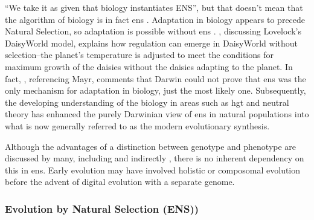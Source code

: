 ``We take it as given that biology instantiates ENS'', but that doesn't mean that the algorithm of biology is in fact \gls{ens} \autocite{Watson2012}. Adaptation in biology appears to precede Natural Selection, so adaptation is possible without \gls{ens} \cite{Watson2010}. \cite{Saunders1994}, discussing Lovelock's DaisyWorld model, explains how regulation can emerge in DaisyWorld without selection--the planet's temperature is adjusted to meet the conditions for maximum growth of the daisies without the daisies adapting to the planet. In fact, \cite{Saunders1994}, referencing Mayr, comments that Darwin could not prove that \gls{ens} was the only mechanism for adaptation in biology, just the most likely one. Subsequently, the developing understanding of the biology in areas such as \gls{hgt} and neutral theory \cite{Kimura:1968uq} has enhanced the purely Darwinian view of \gls{ens} in natural populations into what is now generally referred to as the modern evolutionary synthesis.

Although the advantages of a distinction between genotype and phenotype are discussed by many, including \autocite[section 7.2.3]{Taylor1999} and indirectly \cite{VonNeumann1966}, there is no inherent dependency on this in \gls{ens}. Early evolution may have involved holistic or composomal evolution before the advent of digital evolution with a separate genome.



\subsubsection{Evolution by Natural Selection (ENS))}\label{ens-evolution-by-natural-selection}

